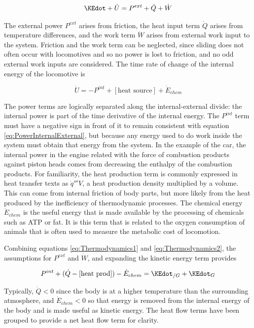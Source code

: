 \begin{equation}
\KEdot + \dot{U} = P^{ext} + \dot{Q} + \dot{W}
\label{eq:Thermodynamics1}
\end{equation}

The external power $P^{ext}$ arises from friction, the heat input term $\dot{Q}$ arises from temperature differences, and the work term $\dot{W}$ arises from external work input to the system. Friction and the work term can be neglected, since sliding does not often occur with locomotives and so no power is lost to friction, and no odd external work inputs are considered. The time rate of change of the internal energy of the locomotive is

\begin{equation}
\dot{U} = -P^{int} + [\mbox{heat source}] + \dot{E}_{chem}
\label{eq:Thermodynamics2}
\end{equation}

The power terms are logically separated along the internal-external divide: the internal power is part of the time derivative of the internal energy. The $P^{int}$ term must have a negative sign in front of it to remain consistent with equation \ref{eq:PowerInternalExternal}, but because any energy used to do work inside the system must obtain that energy from the system. In the example of the car, the internal power in the engine related with the force of combustion products against piston heads comes from decreasing the enthalpy of the combustion products. For familiarity, the heat production term is commonly expressed in heat transfer texts as $\dot{q}'''V$, a heat production density multiplied by a volume. This can come from internal friction of body parts, but more likely from the heat produced by the inefficiency of thermodynamic processes. The chemical energy $\dot{E}_{chem}$ is the useful energy that is made available by the processing of chemicals such as ATP or fat. It is this term that is related to the oxygen consumption of animals that is often used to measure the metabolic cost of locomotion.

Combining equations \ref{eq:Thermodynamics1} and \ref{eq:Thermodynamics2}, the assumptions for $P^{ext}$ and $\dot{W}$, and expanding the kinetic energy term provides

\begin{equation}
P^{int} + (\dot{Q} - [\mbox{heat prod}]) - \dot{E}_{chem} = \KEdot_{/G} + \KEdot_{G}
\end{equation}

Typically, $\dot{Q} < 0$ since the body is at a higher temperature than the surrounding atmosphere, and $\dot{E}_{chem} < 0$ so that energy is removed from the internal energy of the body and is made useful as kinetic energy. The heat flow terms have been grouped to provide a net heat flow term for clarity.

